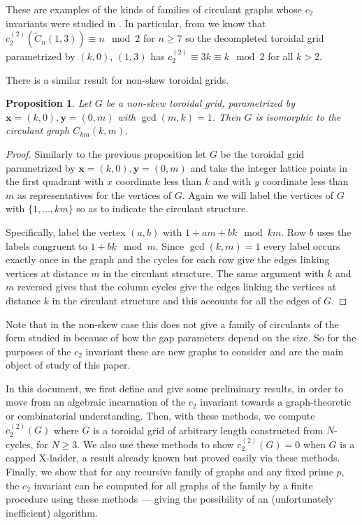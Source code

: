 \documentclass[12pt]{amsart}
\newtheorem{proposition}[definition]{Proposition}
\numberwithin{definition}{section}
\begin{document}
These are examples of the kinds of families of circulant graphs whose $c_2$ invariants were studied in \cite{Yeats2016}.  In particular, from \cite{Yeats2016} we know that $c_2^{(2)}(\widetilde{C}_n(1,3)) \equiv n \mod 2$ for $n\geq 7$ so the decompleted toroidal grid parametrized by $(k, 0)$, $(1, 3)$ has $c_2^{(2)} \equiv 3k \equiv k \mod 2$ for all $k > 2$.  

There is a similar result for non-skew toroidal grids.
\begin{proposition}
	Let $G$ be a non-skew toroidal grid, parametrized by $\mathbf{x}=(k,0), \mathbf{y}=(0,m)$ with $\gcd(m, k)=1$. Then $G$ is isomorphic to the circulant graph $C_{km}(k,m)$. 
\end{proposition}

\begin{proof}
Similarly to the previous proposition let $G$ be the toroidal grid parametrized by $\mathbf{x}=(k,0), \mathbf{y}=(0,m)$ and take the integer lattice points in the first quadrant with $x$ coordinate less than $k$ and with $y$ coordinate less than $m$ as representatives for the vertices of $G$.  Again we will label the vertices of $G$ with $\{1, \ldots, km\}$ so as to indicate the circulant structure.

Specifically, label the vertex $(a,b)$ with $1+am+bk \mod km$.  Row $b$ uses the labels congruent to $1+bk \mod m$.  Since $\gcd(k,m)=1$ every label occurs exactly once in the graph and the cycles for each row give the edges linking vertices at distance $m$ in the circulant structure.  The same argument with $k$ and $m$ reversed gives that the column cycles give the edges linking the vertices at distance $k$ in the circulant structure and this accounts for all the edges of $G$.
\end{proof}

Note that in the non-skew case this does not give a family of circulants of the form studied in \cite{Yeats2016} because of how the gap parameters depend on the size.  So for the purposes of the $c_2$ invariant these are new graphs to consider and are the main object of study of this paper.

\medskip


In this document, we first define and give some preliminary results, in order to move from an algebraic incarnation of the $c_2$ invariant towards a graph-theoretic or combinatorial understanding. Then, with these methods, we compute $c_2^{(2)}(G)$ where $G$ is a toroidal grid of arbitrary length constructed from $N$-cycles, for $N\geq 3$. We also use these methods to show $c_2^{(2)}(G)=0$ when $G$ is a capped X-ladder, a result already known but proved easily via these methods. Finally, we show that for any recursive family of graphs and any fixed prime $p$, the $c_2$ invariant can be computed for all graphs of the family by a finite procedure using these methods --- giving the possibility of an (unfortunately inefficient) algorithm. \\
\end{document}
